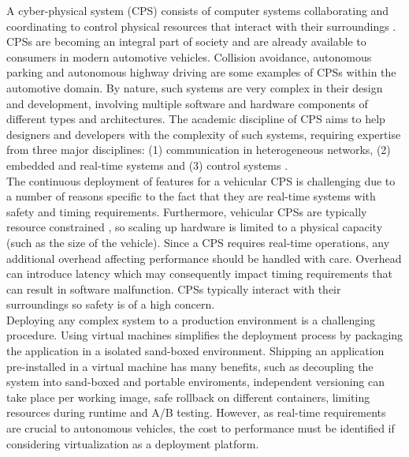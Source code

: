 A cyber-physical system (CPS) consists of computer systems collaborating and coordinating to control physical resources that interact with their surroundings \cite{cps}. CPSs are becoming an integral part of society and are already available to consumers in modern automotive vehicles. Collision avoidance, autonomous parking and autonomous highway driving are some examples of CPSs within the automotive domain. By nature, such systems are very complex in their design and development, involving multiple software and hardware components of different types and architectures. The academic discipline of CPS aims to help designers and developers with the complexity of such systems, requiring expertise from three major disciplines: (1) communication in heterogeneous networks, (2) embedded and real-time systems and (3) control systems \cite{gonz}. \\

The continuous deployment of features for a vehicular CPS is challenging due to a number of reasons specific to the fact that they are real-time systems with safety and timing requirements. Furthermore, vehicular CPSs are typically resource constrained \cite{wan2011advances}, so scaling up hardware is limited to a physical capacity (such as the size of the vehicle). Since a CPS requires real-time operations, any additional overhead affecting performance should be handled with care. Overhead can introduce latency which may consequently impact timing requirements that can result in software malfunction. CPSs typically interact with their surroundings so safety is of a high concern. \\

Deploying any complex system to a production environment is a challenging procedure. Using virtual machines simplifies the deployment process by packaging the application in a isolated sand-boxed environment. Shipping an application pre-installed in a virtual machine has many benefits, such as decoupling the system into sand-boxed and portable enviroments, independent versioning can take place per working image, safe rollback on different containers, limiting resources during runtime and A/B testing. However, as real-time requirements are crucial to autonomous vehicles, the cost to performance must be identified if considering virtualization as a deployment platform.\\


